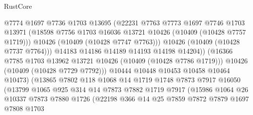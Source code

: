 \begin{lexlean}{RustCore}
\begin{coremodule}
                              @7774
                              @1697
                              @7736
                              @1703
                              @13695
                              (@22231
                                @7763
                                @7773
                                @1697
                                @7746
                                @1703
                                @13971
                                (@18598
                                  @7756
                                  @1703
                                  @16036
                                  @13721
                                  @10426
                                  (@10409 (@10428 @7757 @1719)))
                                @10426
                                (@10409 (@10428 @7747 @7763)))
                              @10426
                              (@10409 (@10428 @7737 @7764)))
                            @14183
                            @14186
                            @14189
                            @14193
                            @14198
                            @14204))
                        (@16366 @7785 @1703 @13962 @13721 @10426 (@10409 (@10428 @7786 @1719)))
                        @10426
                        (@10409 (@10428 @7729 @7792)))
                      @10444
                      @10448
                      @10453
                      @10458
                      @10464
                      @10473)
                    (@13865
                      @7802
                      @118
                      @1068
                      @14
                      @1719
                      @1748
                      @7873
                      @7917
                      @16050
                      (@13799
                        @1065
                        @925
                        @314
                        @14
                        @7873
                        @7882
                        @1719
                        @7917
                        (@15986
                          @1064
                          @26
                          @10337
                          @7873
                          @7880
                          @1726
                          (@22198
                            @366
                            @14
                            @25
                            @7859
                            @7872
                            @7879
                            @1697
                            @7808
                            @1703

\end{coremodule}
\end{lexlean}
